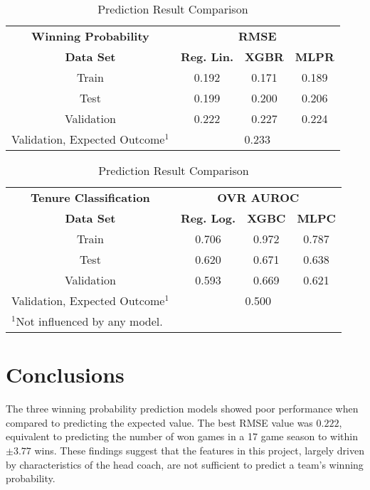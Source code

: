 \documentclass[conference]{IEEEtran}
\begin{document}
\begin{table}[htbp]
\caption{Prediction Result Comparison}
\begin{center}
\begin{tabular}{|c||c|c|c|}
\hline
\textbf{Winning Probability} & \multicolumn{3}{|c|}{\textbf{RMSE}}\\
\cline{2-4} 
\textbf{Data Set} & \textbf{Reg. Lin.} &  \textbf{XGBR} &  \textbf{MLPR} \\
\hline
\hline
Train & 0.192 & 0.171 & 0.189\\
\hline
Test & 0.199 & 0.200 & 0.206 \\
\hline
Validation & 0.222 & 0.227 & 0.224 \\
\hline
Validation, Expected Outcome$^{\mathrm{1}}$ & \multicolumn{3}{|c|}{0.233} \\
\hline
\end{tabular}
\label{cum1}
\end{center}

\begin{center}
\begin{tabular}{|c||c|c|c|}
\hline
\textbf{Tenure Classification} & \multicolumn{3}{|c|}{\textbf{OVR AUROC}}\\
\cline{2-4} 
\textbf{Data Set} & \textbf{Reg. Log.} &  \textbf{XGBC} &  \textbf{MLPC} \\
\hline
\hline
Train & 0.706 & 0.972 & 0.787\\
\hline
Test & 0.620 & 0.671 & 0.638 \\
\hline
Validation & 0.593 & 0.669 & 0.621 \\
\hline
Validation, Expected Outcome$^{\mathrm{1}}$ & \multicolumn{3}{|c|}{0.500} \\
\hline
\multicolumn{2}{l}{$^{\mathrm{1}}$Not influenced by any model.}
\end{tabular}
\label{cum2}
\end{center}
\end{table} 

\section{Conclusions}
The three winning probability prediction models showed poor performance when compared to predicting the expected value. The best RMSE value was $0.222$, equivalent to predicting the number of won games in a 17 game season to within $\pm3.77$ wins. These findings suggest that the features in this project, largely driven by characteristics of the head coach, are not sufficient to predict a team's winning probability.
\end{document}
